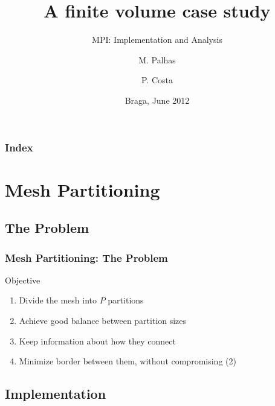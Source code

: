 \documentclass{beamer}
\title{A finite volume case study}
\subtitle{MPI: Implementation and Analysis}
\author{M. Palhas \and P. Costa}
\institute[19808 \and 19830]{
	University of Minho\\
	Department of Informatics
}
\date{Braga, June 2012}
\begin{document}

\begin{frame}[plain]
	\titlepage
\end{frame}

\begin{frame}
	\frametitle{Index}
	\tableofcontents
\end{frame}



%
%
%
%

\section{Mesh Partitioning}

\subsection{The Problem}

\begin{frame}
	\frametitle{Mesh Partitioning: The Problem}

	\begin{block}{Objective}
		\begin{enumerate}\itemsep=10pt
			\item Divide the mesh into $P$ partitions
			\item Achieve good balance between partition sizes
			\item Keep information about how they connect
			\item Minimize border between them, without compromising (2)
		\end{enumerate}
	\end{block}


\end{frame}




%
%
%
%

\subsection{Implementation}
\end{document}
